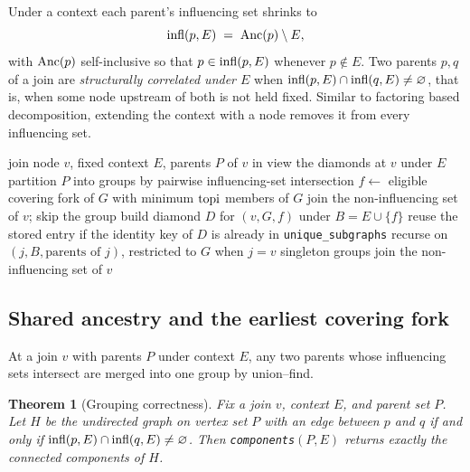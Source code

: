 \documentclass[12pt]{report}
\newtheorem{theorem}{Theorem}
\begin{document}
Under a context each parent's influencing set shrinks to
\[
\mathrm{infl}(p,E) \;=\; \mathrm{Anc}(p)\setminus E ,
\]
with $\mathrm{Anc}(p)$ self-inclusive so that $p \in \mathrm{infl}(p,E)$ whenever $p \notin E$. Two parents $p, q$ of a join are \emph{structurally correlated under $E$} when $\mathrm{infl}(p,E) \cap \mathrm{infl}(q,E) \neq \varnothing$, that is, when some node upstream of both is not held fixed. Similar to factoring based decomposition, extending the context with a node removes it from every influencing set.

\begin{algorithm}[htbp]
\caption{Recursive diamond identification (skeleton)}
\label{alg:new-identify}
\begin{algorithmic}[1]
\Require join node $v$, fixed context $E$, parents $P$ of $v$ in view
\Ensure the diamonds at $v$ under $E$
\State partition $P$ into groups by pairwise influencing-set intersection
    \State $f \gets$ eligible covering fork of $G$ with minimum $\mathrm{topi}$
        \State members of $G$ join the non-influencing set of $v$; skip the group
    \EndIf
    \State build diamond $D$ for $(v, G, f)$ under $B = E \cup \{f\}$
    \State reuse the stored entry if the identity key of $D$ is already in \texttt{unique\_subgraphs}
        \State recurse on $(j, B, \text{parents of } j)$, restricted to $G$ when $j = v$
    \EndFor
\EndFor
\State singleton groups join the non-influencing set of $v$
\end{algorithmic}
\end{algorithm}

\subsection{Shared ancestry and the earliest covering fork}
\label{sec:dd-partition}
\label{sec:dd-fork}

At a join $v$ with parents $P$ under context $E$, any two parents whose influencing sets intersect are merged into one group by union--find.

\begin{theorem}[Grouping correctness]
\label{thm:grouping}
Fix a join $v$, context $E$, and parent set $P$. Let $H$ be the undirected graph on vertex set $P$ with an edge between $p$ and $q$ if and only if $\mathrm{infl}(p,E) \cap \mathrm{infl}(q,E) \neq \varnothing$. Then \texttt{components}$(P,E)$ returns exactly the connected components of $H$.
\end{theorem}
\end{document}
